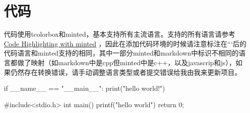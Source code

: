 \documentclass{article}%
\begin{document}
%
\normalsize%
%

%
\section{代码}%

%
代码使用tcolorbox和minted，基本支持所有主流语言。支持的所有语言请参考 \href{https://www.overleaf.com/learn/latex/Code_Highlighting_with_minted}{Code Highlighting with minted} ，因此在添加代码环境的时候请注意标注在```后的代码语言和minted支持的相同，其中一部分minted和markdown中标识不相同的语言都做了映射（如markdown中是cpp但minted中是c++，以及javascrip和js），如果仍然存在转换错误，请手动调整语言类型或者提交错误给我由我来更新项目。%

%
\begin{langbox}[Python]%
if __name__ == "__main__":%
print("hello world!")%
\end{langbox}%
%

%
\begin{langbox}[C++]%
#include<stdio.h>%
int main(){%
printf("hello world")%
return 0;%
}%
%
\end{langbox}%
\end{document}
